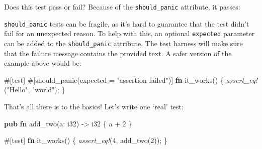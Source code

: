 \documentclass[a4paper,]{book}
\newenvironment{Shaded}{\begin{snugshade}}{\end{snugshade}}
\newcommand{\KeywordTok}[1]{\textcolor[rgb]{0.13,0.29,0.53}{\textbf{{#1}}}}
\newcommand{\DataTypeTok}[1]{\textcolor[rgb]{0.13,0.29,0.53}{{#1}}}
\newcommand{\DecValTok}[1]{\textcolor[rgb]{0.00,0.00,0.81}{{#1}}}
\newcommand{\StringTok}[1]{\textcolor[rgb]{0.31,0.60,0.02}{{#1}}}
\newcommand{\PreprocessorTok}[1]{\textcolor[rgb]{0.56,0.35,0.01}{\textit{{#1}}}}
\newcommand{\AttributeTok}[1]{\textcolor[rgb]{0.77,0.63,0.00}{{#1}}}
\newcommand{\NormalTok}[1]{{#1}}
\begin{document}
Does this test pass or fail? Because of the \texttt{should\_panic}
attribute, it passes:

\begin{Shaded}
\end{Shaded}

\texttt{should\_panic} tests can be fragile, as it's hard to guarantee
that the test didn't fail for an unexpected reason. To help with this,
an optional \texttt{expected} parameter can be added to the
\texttt{should\_panic} attribute. The test harness will make sure that
the failure message contains the provided text. A safer version of the
example above would be:

\begin{Shaded}
\begin{Highlighting}[]
\AttributeTok{#[}\NormalTok{test}\AttributeTok{]}
\AttributeTok{#[}\NormalTok{should_panic}\AttributeTok{(}\NormalTok{expected }\AttributeTok{=} \StringTok{"assertion failed"}\AttributeTok{)]}
\KeywordTok{fn} \NormalTok{it_works() \{}
    \PreprocessorTok{assert_eq!}\NormalTok{(}\StringTok{"Hello"}\NormalTok{, }\StringTok{"world"}\NormalTok{);}
\NormalTok{\}}
\end{Highlighting}
\end{Shaded}

That's all there is to the basics! Let's write one `real' test:

\begin{Shaded}
\begin{Highlighting}[]
\KeywordTok{pub} \KeywordTok{fn} \NormalTok{add_two(a: }\DataTypeTok{i32}\NormalTok{) -> }\DataTypeTok{i32} \NormalTok{\{}
    \NormalTok{a + }\DecValTok{2}
\NormalTok{\}}

\AttributeTok{#[}\NormalTok{test}\AttributeTok{]}
\KeywordTok{fn} \NormalTok{it_works() \{}
    \PreprocessorTok{assert_eq!}\NormalTok{(}\DecValTok{4}\NormalTok{, add_two(}\DecValTok{2}\NormalTok{));}
\NormalTok{\}}
\end{Highlighting}
\end{Shaded}
\end{document}
